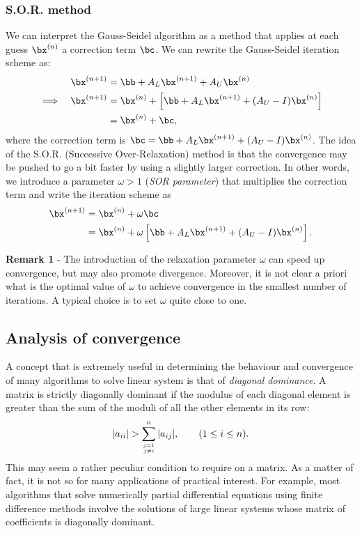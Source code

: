 \subsubsection{S.O.R. method}

We can interpret the Gauss-Seidel algorithm as a method that applies
at each guess $\bx^{(n)}$ a correction term $\bc$.  We can rewrite the
Gauss-Seidel iteration scheme as:
%
\begin{align*}
  && \bx^{(n+1)} & = \bb + A_L \bx^{(n+1)} + A_U \bx^{(n)} \\
  \implies && \bx^{(n+1)} & = \bx^{(n)} + \left [ \bb + A_L \bx^{(n+1)}
    + (A_U - I) \bx^{(n)} \right ] \\
  &&             & = \bx^{(n)} + \bc,
\end{align*}
%
where the correction term is $\bc = \bb + A_L \bx^{(n+1)} + (A_U - I)
\bx^{(n)}$.  The idea of the S.O.R. (Successive Over-Relaxation)
method is that the convergence may be pushed to go a bit faster by
using a slightly larger correction.  In other words, we introduce a
parameter $\omega > 1$ (\textit{SOR parameter}) that multiplies the
correction term and write the iteration scheme as
%
\begin{align*}
  \bx^{(n+1)} & =  \bx^{(n)} + \omega \bc \\
              & =  \bx^{(n)} + \omega
        \left [ \bb + A_L \bx^{(n+1)} + (A_U - I) \bx^{(n)} \right ].
\end{align*}

\noindent \textbf{Remark 1} - The introduction of the relaxation
parameter $\omega$ can speed up convergence, but may also promote
divergence.    Moreover, it is not clear a priori what is the optimal
value of $\omega$ to achieve convergence in the smallest number of
iterations.    A typical choice is to set $\omega$ quite close to one.


\subsection{Analysis of convergence}

A concept that is extremely useful in determining the behaviour and
convergence of many algorithms to solve linear system is that of
\textit{diagonal dominance}.  A matrix is strictly diagonally dominant
if the modulus of each diagonal element is greater than the sum of the
moduli of all the other elements in its row:
%
\begin{equation*}
  | a_{i i} | > \sum_{\genfrac{}{}{0pt}{}{j=1}{j \ne i}}^n
  | a_{i j} |, \qquad (1 \le i \le n) .
\end{equation*}
%
This may seem a rather peculiar condition to require on a matrix.  As
a matter of fact, it is not so for many applications of practical
interest.  For example, most algorithms that solve numerically partial
differential equations using finite difference methods involve the
solutions of large linear systems whose matrix of coefficients is
diagonally dominant.

